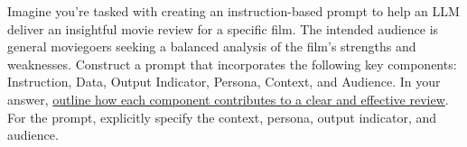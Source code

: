 \documentclass[11pt,addpoints,answers]{exam}
\begin{document}
\begin{questions}
\begin{solution}
\end{solution}


%
%
%
%
%


\question[8] Imagine you're tasked with creating an instruction-based prompt to help an LLM deliver an insightful movie review for a specific film. The intended audience is general moviegoers seeking a balanced analysis of the film's strengths and weaknesses. Construct a prompt that incorporates the following key components: Instruction, Data, Output Indicator, Persona, Context, and Audience. In your answer, \ul{outline how each component contributes to a clear and effective review}. For the prompt, explicitly specify the context, persona, output indicator, and audience.


\end{questions}
\end{document}
